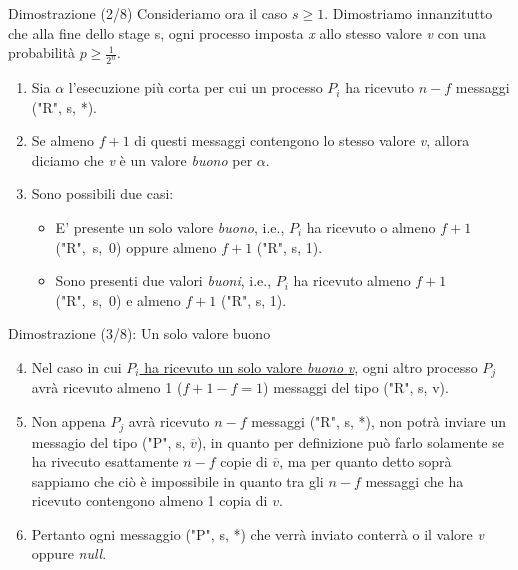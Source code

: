 \documentclass{beamer}
\begin{document}
\begin{frame}{Dimostrazione (2/8)}
    Consideriamo ora il caso $s \geq 1$. \newline
    Dimostriamo innanzitutto che alla fine dello stage s, ogni processo imposta \textit{x} allo stesso valore \textit{v} con una probabilità $p \geq \frac{1}{2^n}$. 
    \begin{enumerate}
        \item<1-> Sia $\alpha$ l'esecuzione più corta per cui un processo $P_{i}$ ha ricevuto $n - f$ messaggi ("R", s, *).
        \item<2-> Se almeno $f + 1$ di questi messaggi contengono lo stesso valore \textit{v}, allora diciamo che \textit{v} è un valore \textit{buono} per $\alpha$. 
        \item<3-> Sono possibili due casi:
        \begin{itemize}%
            \item E' presente un solo valore \textit{buono}, i.e., $P_{i}$ ha ricevuto o almeno $f + 1$ \mbox{("R", s, 0)} oppure almeno $f + 1$ ("R", s, 1).
            \item Sono presenti due valori \textit{buoni}, i.e., $P_{i}$ ha ricevuto almeno $f + 1$ \mbox{("R", s, 0)} e almeno $f + 1$ ("R", s, 1).
        \end{itemize}
    \end{enumerate}
\end{frame}

\begin{frame}{Dimostrazione (3/8): Un solo valore buono}
    \begin{enumerate}
        \setcounter{enumi}{3}
        \item<1-> Nel caso in cui \underline{$P_{i}$ ha ricevuto un solo valore \textit{buono} \textit{v}}, ogni altro processo $P_{j}$ avrà ricevuto almeno 1 ($f + 1 - f = 1$) messaggi del tipo ("R", s, v).
        \item<2-> Non appena $P_{j}$ avrà ricevuto $n - f$ messaggi ("R", s, *), non potrà inviare un messagio del tipo ("P", s, $\overline{v}$), in quanto per definizione può farlo solamente se ha rivecuto esattamente $n - f$ copie di $\overline{v}$, ma per quanto detto soprà sappiamo che ciò è impossibile in quanto tra gli $n - f$ messaggi che ha ricevuto contengono almeno 1 copia di $v$.
        \item<3-> Pertanto ogni messaggio ("P", s, *) che verrà inviato conterrà o il valore \textit{v} oppure \textit{null}.
    \end{enumerate}
\end{frame}
\end{document}
